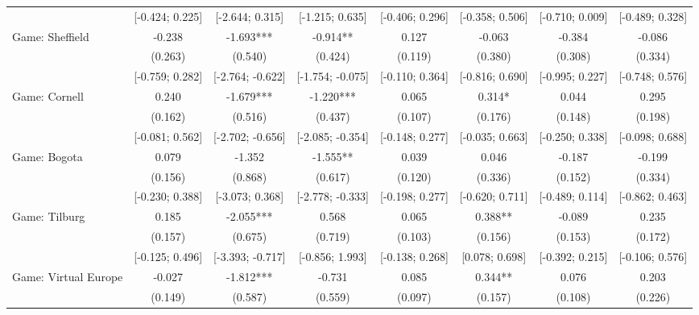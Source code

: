 \begin{tabular}{l*{7}{c}}
                    &[-0.424; 0.225]   &[-2.644; 0.315]   &[-1.215; 0.635]   &[-0.406; 0.296]   &[-0.358; 0.506]   &[-0.710; 0.009]   &[-0.489; 0.328]   \\
Game: Sheffield     &      -0.238   &      -1.693***&      -0.914** &       0.127   &      -0.063   &      -0.384   &      -0.086   \\
                    &     (0.263)   &     (0.540)   &     (0.424)   &     (0.119)   &     (0.380)   &     (0.308)   &     (0.334)   \\
                    &[-0.759; 0.282]   &[-2.764; -0.622]   &[-1.754; -0.075]   &[-0.110; 0.364]   &[-0.816; 0.690]   &[-0.995; 0.227]   &[-0.748; 0.576]   \\
Game: Cornell       &       0.240   &      -1.679***&      -1.220***&       0.065   &       0.314*  &       0.044   &       0.295   \\
                    &     (0.162)   &     (0.516)   &     (0.437)   &     (0.107)   &     (0.176)   &     (0.148)   &     (0.198)   \\
                    &[-0.081; 0.562]   &[-2.702; -0.656]   &[-2.085; -0.354]   &[-0.148; 0.277]   &[-0.035; 0.663]   &[-0.250; 0.338]   &[-0.098; 0.688]   \\
Game: Bogota        &       0.079   &      -1.352   &      -1.555** &       0.039   &       0.046   &      -0.187   &      -0.199   \\
                    &     (0.156)   &     (0.868)   &     (0.617)   &     (0.120)   &     (0.336)   &     (0.152)   &     (0.334)   \\
                    &[-0.230; 0.388]   &[-3.073; 0.368]   &[-2.778; -0.333]   &[-0.198; 0.277]   &[-0.620; 0.711]   &[-0.489; 0.114]   &[-0.862; 0.463]   \\
Game: Tilburg       &       0.185   &      -2.055***&       0.568   &       0.065   &       0.388** &      -0.089   &       0.235   \\
                    &     (0.157)   &     (0.675)   &     (0.719)   &     (0.103)   &     (0.156)   &     (0.153)   &     (0.172)   \\
                    &[-0.125; 0.496]   &[-3.393; -0.717]   &[-0.856; 1.993]   &[-0.138; 0.268]   &[0.078; 0.698]   &[-0.392; 0.215]   &[-0.106; 0.576]   \\
Game: Virtual Europe&      -0.027   &      -1.812***&      -0.731   &       0.085   &       0.344** &       0.076   &       0.203   \\
                    &     (0.149)   &     (0.587)   &     (0.559)   &     (0.097)   &     (0.157)   &     (0.108)   &     (0.226)   \\

\end{tabular}
